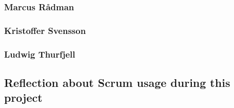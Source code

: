 \subsubsection{Marcus Rådman}
\subsubsection{Kristoffer Svensson}
\subsubsection{Ludwig Thurfjell}
\subsection{Reflection about Scrum usage during this project}
